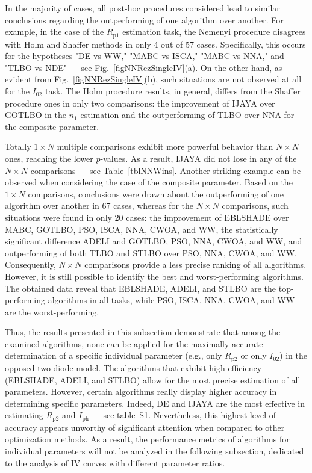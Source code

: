 \documentclass[a4paper,fleqn]{cas-dc}
\begin{document}
In the majority of cases, all post-hoc procedures considered lead to similar conclusions regarding the outperforming of one algorithm over another.
For example, in the case of the $R_\mathrm{p1}$ estimation task,
the Nemenyi procedure disagrees with Holm and Shaffer methods in only 4 out of 57 cases.
Specifically, this occurs for the hypotheses "DE vs WW," "MABC vs ISCA," "MABC vs NNA," and "TLBO vs NDE" --- see Fig.~\ref{figNNRezSingleIV}(a).
On the other hand, as evident from Fig.~\ref{figNNRezSingleIV}(b), such situations are not observed at all for the $I_{02}$ task.
The Holm procedure results, in general, differs from the Shaffer procedure ones in only two comparisons:
the improvement of IJAYA over GOTLBO in the $n_1$ estimation and the outperforming of TLBO over NNA for the composite parameter.

Totally $1\times N$ multiple comparisons exhibit more powerful behavior than $N\times N$ ones, reaching the lower $p$-values.
As a result, IJAYA did not lose in any of the $N\times N$ comparisons --- see Table~\ref{tblNNWins}.
Another striking  example can be observed when considering the case of the composite parameter.
Based on the $1\times N$ comparisons, conclusions were drawn about the outperforming of one algorithm over another in 67 cases,
whereas for the $N\times N$ comparisons, such situations were found in only 20 cases:
the improvement of EBLSHADE over MABC, GOTLBO, PSO, ISCA, NNA, CWOA, and WW,
the statistically significant difference ADELI and GOTLBO, PSO, NNA, CWOA, and WW,
and outperforming of both TLBO and STLBO over PSO, NNA, CWOA, and WW.
Consequently, $N\times N$ comparisons provide a less precise ranking of all algorithms.
However, it is still possible to identify the best and worst-performing algorithms.
The obtained data reveal that EBLSHADE, ADELI, and STLBO are the top-performing algorithms in all tasks,
while PSO, ISCA, NNA, CWOA, and WW are the worst-performing.

Thus, the results presented in this subsection demonstrate that
among the examined algorithms, none can be applied for the maximally accurate determination
of a specific individual parameter (e.g., only $R_\mathrm{p2}$ or only $I_{02}$) in the opposed two-diode model.
The algorithms that exhibit high efficiency (EBLSHADE, ADELI, and STLBO) allow for the most precise estimation of all parameters.
However, certain algorithms really display higher accuracy in determining specific parameters.
Indeed, DE and IJAYA are the most effective in estimating $R_\mathrm{p2}$ and $I_\mathrm{ph}$ --- see table~S1.
Nevertheless, this highest level of accuracy appears unworthy of significant attention when compared to other optimization methods.
As a result, the performance metrics of algorithms for individual parameters will not be analyzed
in the following subsection, dedicated to the analysis of IV curves with different parameter ratios.
\end{document}

